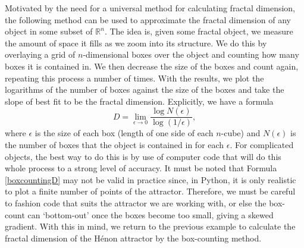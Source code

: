 Motivated by the need for a universal method for calculating fractal dimension, the following method can be used to approximate the fractal dimension of any object in some subset of $\mathbb{R}^n$. The idea is, given some fractal object, we measure the amount of space it fills as we zoom into its structure. We do this by overlaying a grid of $n$-dimensional boxes over the object and counting how many boxes it is contained in. We then decrease the size of the boxes and count again, repeating this process a number of times. With the results, we plot the logarithms of the number of boxes against the size of the boxes and take the slope of best fit to be the fractal dimension. Explicitly, we have a formula
\begin{equation}
    D = \lim_{\epsilon \to 0} \frac{\log N(\epsilon)}{\log(1/\epsilon)},
\end{equation}\label{boxcountingD}
where $\epsilon$ is the size of each box (length of one side of each $n$-cube) and $N(\epsilon)$ is the number of boxes that the object is contained in for each $\epsilon$. For complicated objects, the best way to do this is by use of computer code that will do this whole process to a strong level of accuracy. It must be noted that Formula \ref{boxcountingD} may not be valid in practice since, in Python, it is only realistic to plot a finite number of points of the attractor. Therefore, we must be careful to fashion code that suits the attractor we are working with, or else the box-count can `bottom-out' once the boxes become too small, giving a skewed gradient. With this in mind, we return to the previous example to calculate the fractal dimension of the Hénon attractor by the box-counting method.
